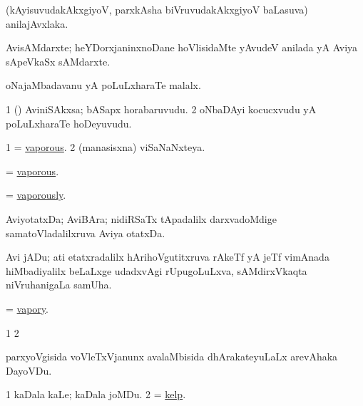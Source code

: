 \bentry
{} 
\gl{\nA}
\expl{}
\bmng
 (kAyisuvudakAkxgiyoV, parxkAsha biVruvudakAkxgiyoV baLasuva) anilajAvxlaka. 
\emng
\eentry

\bentry
{}
\gl{\nA}
\expl{}
\bmng
 AvisAMdarxte; heYDorxjaninxnoDane hoVlisidaMte yAvudeV anilada yA Aviya sApeVkaSx sAMdarxte. 
\emng
\eentry

\bentry
{} 
\gl{\nA}
\expl{}
\bmng
 oNajaMbadavanu yA poLuLxharaTe malalx. 
\emng
\eentry

\bentry
{} 
\gl{\nA}
\expl{}
\bmng
\bnum
\num{1} (\viparx) AviniSAkxsa; bASapx horabaruvudu. 
\num{2} oNbaDAyi kocucxvudu yA poLuLxharaTe hoDeyuvudu. 
\enum
\emng
\eentry

\bentry
{} 
\gl{\gu}
\expl{}
\bmng
\bnum
\num{1} = \hyperlink{vaporous}{vaporous}. 
\num{2} (manasisxna) viSaNaNxteya. 
\enum
\emng
\eentry

\bentry
{} 
\gl{\gu}
\expl{}
\bmng
 = \hyperlink{vaporous}{vaporous}. 
\emng
\eentry

\bentry
{} 
\gl{\kirxvi}
\expl{}
\bmng
 = \hyperlink{vaporously}{vaporously}. 
\emng
\eentry

\bentry
{}
\gl{\nA}
\expl{}
\bmng
 AviyotatxDa; AviBAra; nidiRSaTx tApadalilx darxvadoMdige samatoVladalilxruva Aviya otatxDa. 
\emng
\eentry

\bentry
{}
\gl{\nA}
\expl{}
\bmng
 Avi jADu; ati etatxradalilx hArihoVgutitxruva rAkeTf yA jeTf vimAnada hiMbadiyalilx beLaLxge udadxvAgi rUpugoLuLxva, sAMdirxVkaqta niVruhanigaLa samUha. 
\emng
\eentry

\bentry
{} 
\gl{\gu}
\expl{}
\bmng
 = \hyperlink{vapory}{vapory}. 
\emng
\eentry

\bentry 
{}
\gl{\saMkiSx}
\expl{}
\bmng
\bnum
\num{1}  
\num{2}  
\enum
\emng
\eentry

\bentry
{} 
\gl{\nA}
\expl{}
\bmng
 parxyoVgisida voVleTxVjanunx avalaMbisida dhArakateyuLaLx arevAhaka DayoVDu. 
\emng
\eentry

\bentry
{} 
\gl{\nA}
\expl{}
\bmng
\bnum
\num{1} kaDala kaLe; kaDala joMDu. 
\num{2} = \hyperref{kandict_k.pdf}{K}{kelp}{kelp}. 
\enum
\emng
\eentry

